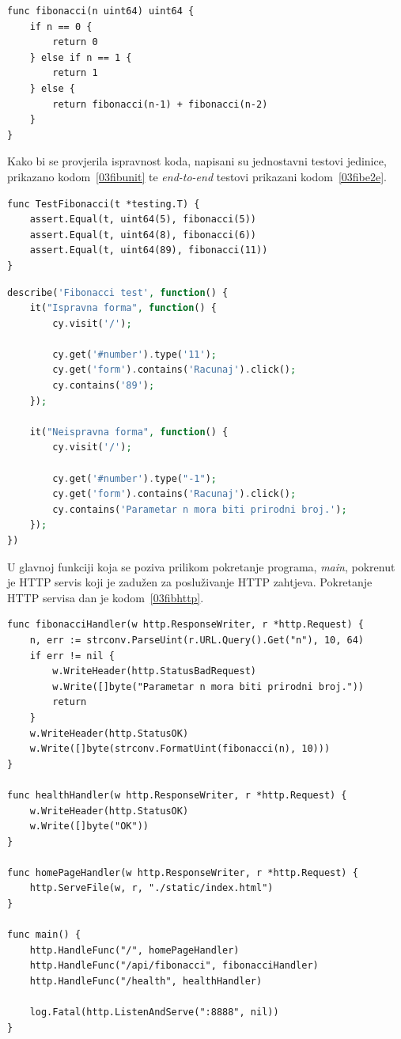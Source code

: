 \begin{lstlisting}[float=h]
func fibonacci(n uint64) uint64 {
	if n == 0 {
		return 0
	} else if n == 1 {
		return 1
	} else {
		return fibonacci(n-1) + fibonacci(n-2)
	}
}
\end{lstlisting}

Kako bi se provjerila ispravnost koda, napisani su jednostavni testovi jedinice, prikazano
kodom~\ref{03fibunit} te \textit{end-to-end} testovi prikazani kodom~\ref{03fibe2e}.

\begin{lstlisting}[float=h]
func TestFibonacci(t *testing.T) {
	assert.Equal(t, uint64(5), fibonacci(5))
	assert.Equal(t, uint64(8), fibonacci(6))
	assert.Equal(t, uint64(89), fibonacci(11))
}
\end{lstlisting}

\begin{lstlisting}[language=php,float=h]
describe('Fibonacci test', function() {
    it("Ispravna forma", function() {
        cy.visit('/');

        cy.get('#number').type('11');
        cy.get('form').contains('Racunaj').click();
        cy.contains('89');
    });

    it("Neispravna forma", function() {
        cy.visit('/');

        cy.get('#number').type("-1");
        cy.get('form').contains('Racunaj').click();
        cy.contains('Parametar n mora biti prirodni broj.');
    });
})
\end{lstlisting}

U glavnoj funkciji koja se poziva prilikom pokretanje programa, \textit{main}, pokrenut je HTTP
servis koji je zadužen za posluživanje HTTP zahtjeva. Pokretanje HTTP servisa dan je
kodom~\ref{03fibhttp}.

\begin{lstlisting}[float=h]
func fibonacciHandler(w http.ResponseWriter, r *http.Request) {
	n, err := strconv.ParseUint(r.URL.Query().Get("n"), 10, 64)
	if err != nil {
		w.WriteHeader(http.StatusBadRequest)
		w.Write([]byte("Parametar n mora biti prirodni broj."))
		return
	}
	w.WriteHeader(http.StatusOK)
	w.Write([]byte(strconv.FormatUint(fibonacci(n), 10)))
}

func healthHandler(w http.ResponseWriter, r *http.Request) {
	w.WriteHeader(http.StatusOK)
	w.Write([]byte("OK"))
}

func homePageHandler(w http.ResponseWriter, r *http.Request) {
	http.ServeFile(w, r, "./static/index.html")
}

func main() {
	http.HandleFunc("/", homePageHandler)
	http.HandleFunc("/api/fibonacci", fibonacciHandler)
	http.HandleFunc("/health", healthHandler)

	log.Fatal(http.ListenAndServe(":8888", nil))
}

\end{lstlisting}

